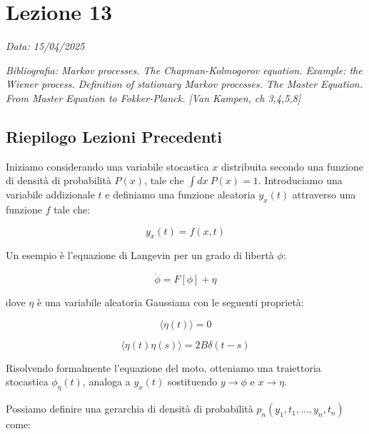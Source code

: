 \chapter{Lezione 13}
\label{chap:lezione_13} %

\begin{flushright}
\textit{Data: 15/04/2025}
\end{flushright}
\textit{Bibliografia: 
Markov processes. The Chapman-Kolmogorov equation. Example: the Wiener process. Definition of stationary Markov processes. The Master Equation. From Master Equation to Fokker-Planck. [Van Kampen, ch 3,4,5,8]}

\section{Riepilogo Lezioni Precedenti}

Iniziamo considerando una variabile stocastica $x$ distribuita secondo una funzione di densità di probabilità $P(x)$, tale che $\int dx~P(x)=1$. Introduciamo una variabile addizionale $t$ e definiamo una funzione aleatoria $y_x(t)$ attraverso una funzione $f$ tale che:


\begin{equation}
y_x(t) = f(x,t)
\end{equation}


Un esempio è l'equazione di Langevin per un grado di libertà $\phi$:


\begin{equation}
\dot{\phi} = F[\phi] + \eta
\end{equation}


dove $\eta$ è una variabile aleatoria Gaussiana con le seguenti proprietà:


\begin{equation}
\langle\eta(t)\rangle = 0
\end{equation}



\begin{equation}
\langle\eta(t)\eta(s)\rangle = 2B\delta(t-s)
\end{equation}


Risolvendo formalmente l'equazione del moto, otteniamo una traiettoria stocastica $\phi_{\eta}(t)$, analoga a $y_x(t)$ sostituendo $y \rightarrow \phi$ e $x \rightarrow \eta$.

Possiamo definire una gerarchia di densità di probabilità $p_n(y_1, t_1, ..., y_n, t_n)$ come:


